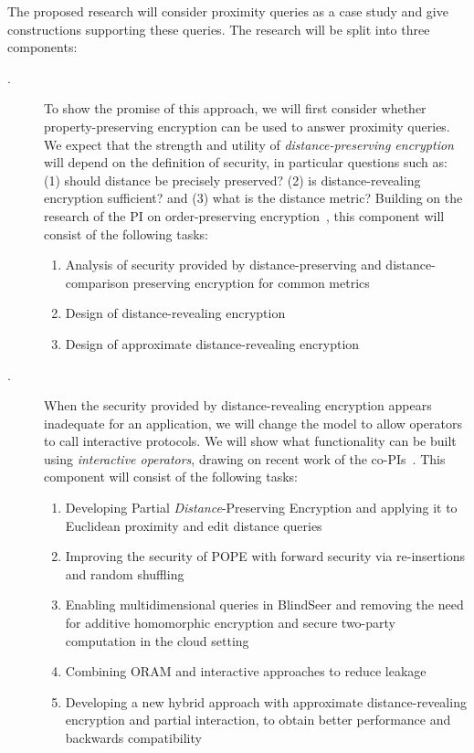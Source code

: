 \noindent
The proposed research will
consider proximity queries as a case study and give constructions supporting
these queries.  The research will be split into three components:
\begin{description}
\item[.] To show the promise of this approach, we
will first consider whether property-preserving encryption can be used
to answer proximity queries.  We expect that the strength and utility of
\emph{distance-preserving encryption} will depend on the definition of
security, in particular questions such as: (1) should distance be precisely preserved? 
(2) is distance-revealing encryption sufficient? and (3) what is the distance
metric? Building on the research of the PI on order-preserving
encryption~\cite{EC:BCLO09,C:BolCheONe11}, this component will consist
of the following tasks:
\begin{enumerate}
\setlength\itemsep{0em}
\item Analysis of security provided by distance-preserving and distance-comparison preserving encryption for common metrics
\item Design of distance-revealing encryption
\item Design of approximate distance-revealing encryption
\end{enumerate}

\item[.] When the security provided by
distance-revealing encryption appears inadequate for an application, we
will change the model to allow operators to call interactive protocols.
We will show what functionality can be built using \emph{interactive
operators}, drawing on recent work of the
co-PIs~\cite{SP:PKVKMC14,CCS:RACY16}.  This component will consist of
the following tasks:
\begin{enumerate}
\setlength\itemsep{0em}
\item Developing Partial \emph{Distance}-Preserving Encryption and
  applying it to Euclidean proximity and edit distance queries
\item Improving the security of POPE with forward security via
  re-insertions and random shuffling
\item Enabling multidimensional queries in BlindSeer and removing the need for
  additive homomorphic encryption and secure two-party computation in the cloud
  setting 
\item Combining ORAM and interactive approaches to reduce leakage
\item Developing a new hybrid approach with approximate
  distance-revealing encryption and partial interaction, to obtain
  better performance and backwards compatibility
\end{enumerate}


\end{description}
